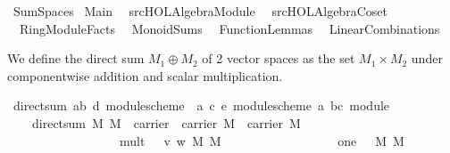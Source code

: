 %
\begin{isabellebody}%
\def\isabellecontext{SumSpaces}%
%
\isamarkuptrue%
%
\isadelimtheory
%
\endisadelimtheory
%
\isatagtheory
{}\isamarkupfalse%
\ SumSpaces\isanewline
{}\ Main\isanewline
\ \ {\isachardoublequoteopen}{\isachartilde}{\isachartilde}{\isacharslash}src{\isacharslash}HOL{\isacharslash}Algebra{\isacharslash}Module{\isachardoublequoteclose}\isanewline
\ \ {\isachardoublequoteopen}{\isachartilde}{\isachartilde}{\isacharslash}src{\isacharslash}HOL{\isacharslash}Algebra{\isacharslash}Coset{\isachardoublequoteclose}\isanewline
\ \ RingModuleFacts\isanewline
\ \ MonoidSums\isanewline
\ \ FunctionLemmas\isanewline
\ \ LinearCombinations\isanewline
{}%
\endisatagtheory
{\isafoldtheory}%
%
\isadelimtheory
%
\endisadelimtheory
%
\begin{isamarkuptext}%
We define the direct sum $M_1\oplus M_2$ of 2 vector spaces as the set $M_1\times M_2$ under
componentwise addition and scalar multiplication.%
\end{isamarkuptext}%
\isamarkuptrue%
\isamarkupfalse%
\ direct{\isacharunderscore}sum{\isacharcolon}{\isacharcolon}\ {\isachardoublequoteopen}{\isacharparenleft}{\isacharprime}a{\isacharcomma}{\isacharprime}b{\isacharcomma}\ {\isacharprime}d{\isacharparenright}\ module{\isacharunderscore}scheme\ {\isasymRightarrow}\ {\isacharparenleft}{\isacharprime}a{\isacharcomma}\ {\isacharprime}c{\isacharcomma}\ {\isacharprime}e{\isacharparenright}\ module{\isacharunderscore}scheme\ {\isasymRightarrow}{\isacharparenleft}{\isacharprime}a{\isacharcomma}\ {\isacharparenleft}{\isacharprime}b{\isasymtimes}{\isacharprime}c{\isacharparenright}{\isacharparenright}\ module{\isachardoublequoteclose}\ \isanewline
\ \ \ \ {\isachardoublequoteopen}direct{\isacharunderscore}sum\ M{}\ M{}\ {\isacharequal}\ {\isasymlparr}carrier\ {\isacharequal}\ carrier\ M{}\ {\isasymtimes}\ carrier\ M{}{\isacharcomma}\ \isanewline
\ \ \ \ \ \ \ \ \ \ \ \ \ \ \ \ \ \ mult\ {\isacharequal}\ {\isacharparenleft}{\isasymlambda}\ v\ w{\isachardot}\ {\isacharparenleft}{\isasymzero}\isactrlbsub M{}\isactrlesub {\isacharcomma}\ {\isasymzero}\isactrlbsub M{}\isactrlesub {\isacharparenright}{\isacharparenright}{\isacharcomma}\isanewline
\ \ \ \ \ \ \ \ \ \ \ \ \ \ \ \ \ \ one\ {\isacharequal}\ \ {\isacharparenleft}{\isasymzero}\isactrlbsub M{}\isactrlesub {\isacharcomma}\ {\isasymzero}\isactrlbsub M{}\isactrlesub {\isacharparenright}{\isacharcomma}\isanewline

\end{isabellebody}
